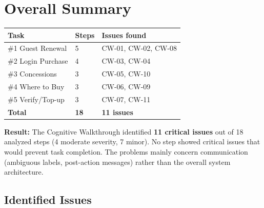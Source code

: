 \section{Overall Summary}

\begin{tcolorbox}[colback=backgroundColor,colframe=primaryColor,arc=2mm]
\small

\renewcommand{\arraystretch}{1.3}
\begin{tabular}{|L{3.5cm}|C{1.5cm}|C{3cm}|}
\hline
\textbf{Task} & \textbf{Steps} & \textbf{Issues found} \\
\hline
\#1 Guest Renewal & 5 & CW-01, CW-02, CW-08 \\
\hline
\#2 Login Purchase & 4 & CW-03, CW-04 \\
\hline
\#3 Concessions & 3 & CW-05, CW-10 \\
\hline
\#4 Where to Buy & 3 & CW-06, CW-09 \\
\hline
\#5 Verify/Top-up & 3 & CW-07, CW-11 \\
\hline
{}
\textbf{Total} & \textbf{18} & \textbf{11 issues} \\
\hline
\end{tabular}

\vspace{0.3cm}
\noindent\textbf{Result:} The Cognitive Walkthrough identified \textbf{11 critical issues} out of 18 analyzed steps (4 moderate severity, 7 minor). No step showed critical issues that would prevent task completion. The problems mainly concern communication (ambiguous labels, post-action messages) rather than the overall system architecture.

\end{tcolorbox}

\vspace{0.3cm}

\subsection{Identified Issues}

